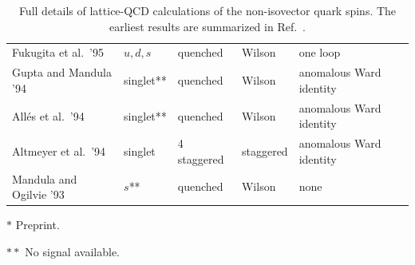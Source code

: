 \begin{table}[!t]
\begin{threeparttable}
\begin{tabular}{lllll}
  Fukugita et al.\ '95 \cite{Fukugita:1994fh} &
  $u,d,s$ & quenched & Wilson & one loop \\

  Gupta and Mandula '94 \cite{Gupta:1994qw} &
  singlet** & quenched & Wilson & anomalous Ward identity \\

  Allés et al.\ '94 \cite{Alles:1994ss} &
  singlet** & quenched & Wilson & anomalous Ward identity \\

  Altmeyer et al.\ '94 \cite{Altmeyer:1992nt} &
  singlet & 4 staggered & staggered & anomalous Ward identity \\

  Mandula and Ogilvie '93 \cite{Mandula:1992bc} &
  $s$** & quenched & Wilson & none \\
  \bottomrule
\end{tabular}
\begin{tablenotes}
\scriptsize
\item[$*$] Preprint.
\item[$**$] No signal available.
\end{tablenotes}
\end{threeparttable}
\caption{\small Full details of lattice-QCD calculations of the non-isovector 
quark spins.
%
The earliest results are summarized in Ref.~\cite{Liu:1995kb}.}
\label{tablenonisovectorquarkspins}
\end{table}

